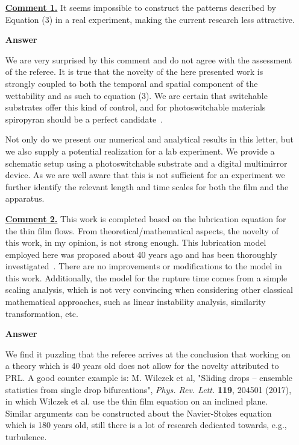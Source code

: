 \documentclass[12pt,english]{article}
\begin{document}
\begin{itemize}

\item[ \textbf{\underline{Comment 1.}}]
{ 
It seems impossible to construct the patterns described by Equation (3) in a real experiment, making the current research less attractive.
}

\item[ \textbf{{Answer}}]
{
We are very surprised by this comment and do not agree with the assessment of the referee. 
It is true that the novelty of the here presented work is strongly coupled to both the temporal and spatial component of the wettability and as such to equation (3).
We are certain that switchable substrates offer this kind of control, and for photoswitchable materials spiropyran should be a perfect candidate~\cite{keyvanradSpiropyranbasedAdvancedPhotoswitchable2022}. 

Not only do we present our numerical and analytical results in this letter, but we also supply a potential realization for a lab experiment. 
We provide a schematic setup using a photoswitchable substrate and a digital multimirror device. 
As we are well aware that this is not sufficient for an experiment we further identify the relevant length and time scales for both the film and the apparatus.
}

\item[ \textbf{\underline{Comment 2.}}] 
{
This work is completed based on the lubrication equation for the thin film flows.
From theoretical/mathematical aspects, the novelty of this work, in my opinion, is not strong enough. 
This lubrication model employed here was proposed about 40 years ago and has been thoroughly investigated~\cite{RevModPhys.69.931, RevModPhys.81.1131}. 
There are no improvements or modifications to the model in this work. 
Additionally, the model for the rupture time comes from a simple scaling analysis, which is not very convincing when considering other classical mathematical approaches, such as linear instability analysis, similarity transformation, etc.
}

\item[ \textbf{{Answer}}]
{
We find it puzzling that the referee arrives at the conclusion that working on a theory which is 40 years old does not allow for the novelty attributed to PRL.
A good counter example is: M. Wilczek et al,
"Sliding drops – ensemble statistics from single drop bifurcations", {\it Phys. Rev. Lett.} {\bf 119}, 204501 (2017), in which Wilczek et al. use the thin film equation on an inclined plane.
Similar arguments can be constructed about the Navier-Stokes equation which is 180 years old, still there is a lot of research dedicated towards, e.g., turbulence.

}
\end{itemize}
\end{document}
